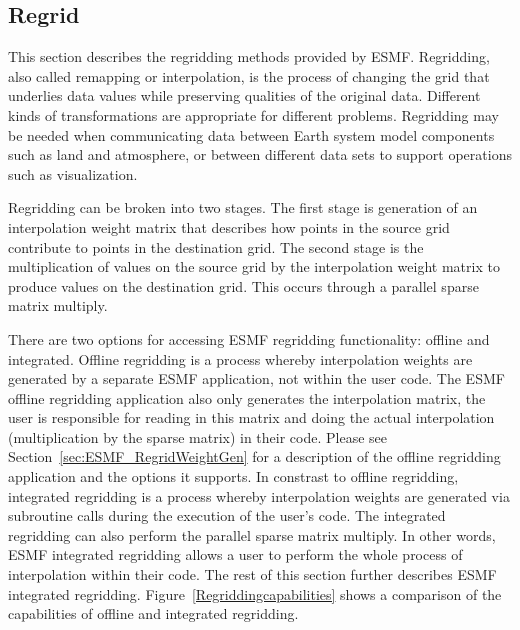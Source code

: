 \subsection{Regrid}\label{sec:regrid}

 This section describes the regridding methods provided by ESMF. Regridding, also called remapping or interpolation, is 
 the process of changing the grid that underlies data values while preserving qualities of the original data. Different 
 kinds of transformations are appropriate for different problems. Regridding may be needed when communicating data between
 Earth system model components such as land and atmosphere, or between different data sets to support operations such as visualization.

 Regridding can be broken into two stages. The first stage is generation of an interpolation weight matrix that describes how points in 
 the source grid contribute to points in the destination grid. The second stage is the multiplication of values on the source grid by the
 interpolation weight matrix to produce values on the destination grid. This occurs through a parallel sparse matrix multiply.

 There are two options for accessing ESMF regridding functionality: offline and integrated. Offline regridding is a process whereby interpolation 
 weights are generated by a separate ESMF application, not within the user code. The ESMF offline regridding application also only generates the interpolation 
 matrix, the user is responsible for reading in this matrix and doing the actual interpolation (multiplication by the sparse matrix) in their code.
 Please see Section~\ref{sec:ESMF_RegridWeightGen} for a description of the offline regridding application and the options it supports. 
 In constrast to offline regridding, integrated regridding is a process whereby interpolation weights are generated via subroutine calls during the
 execution of the user's code. The integrated regridding can also perform the parallel sparse 
 matrix multiply. In other words, ESMF integrated regridding allows a user to perform the whole process of interpolation within their code.
 The rest of this section further describes ESMF integrated regridding. Figure~\ref{Regriddingcapabilities} shows a comparison of the capabilities 
 of offline and integrated regridding. 

